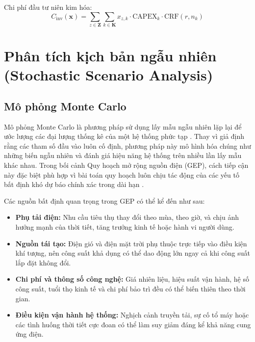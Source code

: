 Chi phí đầu tư niên kim hóa:
\begin{equation}
    C_{\text{inv}}(\mathbf{x}) = \sum_{z \in \mathbf{Z}} \sum_{k \in \mathbf{K}} x_{z,k} \cdot \text{CAPEX}_k \cdot \text{CRF}(r, n_k)
    \label{eq:annualized_capex}
\end{equation}

\section{Phân tích kịch bản ngẫu nhiên (Stochastic Scenario Analysis)}

\subsection{Mô phỏng Monte Carlo}

Mô phỏng Monte Carlo là phương pháp sử dụng lấy mẫu ngẫu nhiên lặp lại để ước lượng các đại lượng thống kê của một hệ thống phức tạp \cite{rubinstein2016monte_carlo}. Thay vì giả định rằng các tham số đầu vào luôn cố định, phương pháp này mô hình hóa chúng như những biến ngẫu nhiên và đánh giá hiệu năng hệ thống trên nhiều lần lấy mẫu khác nhau. Trong bối cảnh Quy hoạch mở rộng nguồn điện (GEP), cách tiếp cận này đặc biệt phù hợp vì bài toán quy hoạch luôn chịu tác động của các yếu tố bất định khó dự báo chính xác trong dài hạn \cite{koltsaklis2018gep,oree2017gep_review}.

Các nguồn bất định quan trọng trong GEP có thể kể đến như sau:
\begin{itemize}
    \item \textbf{Phụ tải điện:} Nhu cầu tiêu thụ thay đổi theo mùa, theo giờ, và chịu ảnh hưởng mạnh của thời tiết, tăng trưởng kinh tế hoặc hành vi người dùng.
    \item \textbf{Nguồn tái tạo:} Điện gió và điện mặt trời phụ thuộc trực tiếp vào điều kiện khí tượng, nên công suất khả dụng có thể dao động lớn ngay cả khi công suất lắp đặt không đổi.
    \item \textbf{Chi phí và thông số công nghệ:} Giá nhiên liệu, hiệu suất vận hành, hệ số công suất, tuổi thọ kinh tế và chi phí bảo trì đều có thể biến thiên theo thời gian.
    \item \textbf{Điều kiện vận hành hệ thống:} Nghịch cảnh truyền tải, sự cố tổ máy hoặc các tình huống thời tiết cực đoan có thể làm suy giảm đáng kể khả năng cung ứng điện.
\end{itemize}

